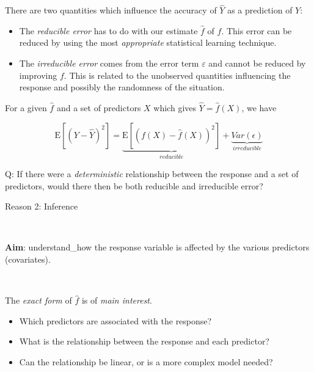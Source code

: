 \documentclass[ignorenonframetext,]{beamer}
\providecommand{\tightlist}{%
  \setlength{\itemsep}{0pt}\setlength{\parskip}{0pt}}
\begin{document}
\begin{frame}

There are two quantities which influence the accuracy of \(\hat{Y}\) as
a prediction of \(Y\):

\begin{itemize}
\tightlist
\item
  The \emph{reducible error} has to do with our estimate \(\hat{f}\) of
  \(f\). This error can be reduced by using the most \emph{appropriate}
  statistical learning technique.
\item
  The \emph{irreducible error} comes from the error term \(\varepsilon\)
  and cannot be reduced by improving \(f\). This is related to the
  unobserved quantities influencing the response and possibly the
  randomness of the situation.
\end{itemize}

For a given \(\hat{f}\) and a set of predictors \(X\) which gives
\(\hat{Y}=\hat{f}(X)\), we have

\[\text{E}[(Y-\hat{Y})^2] = \underbrace{\text{E}[(f(X)-\hat{f}(X))^2]}_{reducible} + \underbrace{Var(\epsilon)}_{irreducible}\]

\end{frame}

\begin{frame}

\begin{block}{Q: If there were a \emph{deterministic} relationship
between the response and a set of predictors, would there then be both
reducible and irreducible error?}

\end{block}

\end{frame}

\begin{frame}

\begin{block}{Reason 2: Inference}

\(~\)

\textbf{Aim}: understand\_how the response variable is affected by the
various predictors (covariates).

\(~\)

The \emph{exact form} of \(\hat{f}\) is of \emph{main interest}.

\begin{itemize}
\tightlist
\item
  Which predictors are associated with the response?
\item
  What is the relationship between the response and each predictor?
\item
  Can the relationship be linear, or is a more complex model needed?
\end{itemize}

\end{block}

\end{frame}
\end{document}
